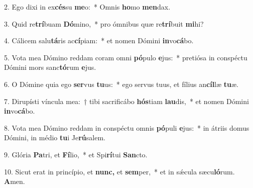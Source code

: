 \item 2. Ego dixi in ex\textbf{cés}su \textbf{me}o:~* Omnis \textbf{ho}mo \textbf{men}dax.
\item 3. Quid re\textbf{trí}buam \textbf{Dó}mino,~* pro ómnibus quæ re\textbf{trí}buit \textbf{mi}hi?
\item 4. Cálicem salu\textbf{tá}ris ac\textbf{cí}piam:~* et nomen Dómini \textbf{in}vo\textbf{cá}bo.
\item 5. Vota mea Dómino reddam coram omni \textbf{pó}pulo \textbf{e}jus:~* pretiósa in conspé\-ctu Dómini mors sanc\textbf{tó}rum \textbf{e}jus.
\item 6. O Dómine quia ego \textbf{ser}vus \textbf{tu}us:~* ego servus tuus, et fílius an\textbf{cíl}læ \textbf{tu}æ.
\item 7. Dirupísti víncula mea:~† tibi sacrificábo \textbf{hós}tiam \textbf{lau}dis,~* et nomen Dómini \textbf{in}vo\textbf{cá}bo.
\item 8. Vota mea Dómino reddam in conspéctu omnis \textbf{pó}puli \textbf{e}jus:~* in átriis domus Dómini, in médio \textbf{tu}i Je\textbf{rú}salem.
\item 9. Glória \textbf{Pa}tri, et \textbf{Fí}lio,~* et Spi\textbf{rí}tui \textbf{San}cto.
\item 10. Sicut erat in princípio, et \textbf{nunc,} et \textbf{sem}per,~* et in sǽcula sæcu\textbf{ló}rum. \textbf{A}men.
